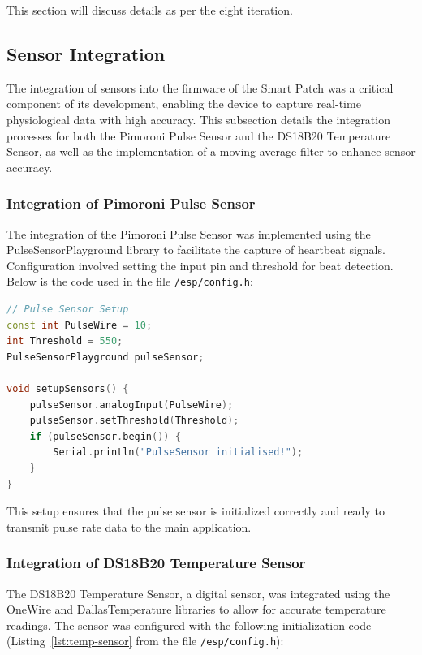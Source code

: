 \noindent This section will discuss details as per the eight iteration.

\newpage
\subsection{Sensor Integration}

The integration of sensors into the firmware of the Smart Patch was a critical component of its development, enabling the device to capture real-time physiological data with high accuracy. This subsection details the integration processes for both the Pimoroni Pulse Sensor and the DS18B20 Temperature Sensor, as well as the implementation of a moving average filter to enhance sensor accuracy.

\subsubsection{Integration of Pimoroni Pulse Sensor}

The integration of the Pimoroni Pulse Sensor was implemented using the PulseSensorPlayground library to facilitate the capture of heartbeat signals. Configuration involved setting the input pin and threshold for beat detection. Below is the code used in the file \texttt{/esp/config.h}:

\begin{lstlisting}[language=C++, caption=Code for Pulse Sensor Integration]
// Pulse Sensor Setup
const int PulseWire = 10;
int Threshold = 550;
PulseSensorPlayground pulseSensor;

void setupSensors() {
    pulseSensor.analogInput(PulseWire);
    pulseSensor.setThreshold(Threshold);
    if (pulseSensor.begin()) {
        Serial.println("PulseSensor initialised!");
    }
}
\end{lstlisting}

This setup ensures that the pulse sensor is initialized correctly and ready to transmit pulse rate data to the main application.

\subsubsection{Integration of DS18B20 Temperature Sensor}

The DS18B20 Temperature Sensor, a digital sensor, was integrated using the OneWire and DallasTemperature libraries to allow for accurate temperature readings. The sensor was configured with the following initialization code (Listing~\ref{lst:temp-sensor} from the file \texttt{/esp/config.h}):

